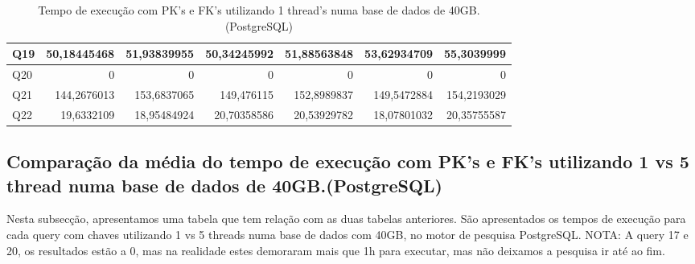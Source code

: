 \documentclass{article}
\begin{document}
\begin{table}[H]
{\begin{tabular}{|l|r|r|r|r|r|r|}
Q19&	50,18445468&	51,93839955	&50,34245992&	51,88563848	&53,62934709&	55,3039999\\ \hline
Q20&	0&	0	&0&	0	&0	&0\\ \hline
Q21&	144,2676013&	153,6837065&	149,476115	&152,8989837	&149,5472884&	154,2193029\\ \hline
Q22&	19,6332109&	18,95484924	&20,70358586	&20,53929782	&18,07801032&	20,35755587\\ \hline
    \end{tabular}}
    \caption{Tempo de execução com PK's e FK's utilizando 1 thread's numa base de dados de 40GB.(PostgreSQL)}
    \label{tab:BC_Table6}
  \end{table}


  \subsection{Comparação da média do tempo de execução com PK's e FK's utilizando 1 vs 5 thread numa base de dados de 40GB.(PostgreSQL)}
\quad Nesta subsecção, apresentamos uma tabela que tem relação com as duas tabelas anteriores. São apresentados os tempos de execução para cada query com chaves utilizando 1 vs 5 threads numa base de dados com 40GB, no motor de pesquisa PostgreSQL.
NOTA: A query 17 e 20, os resultados estão a 0, mas na realidade estes demoraram mais que 1h para executar, mas não deixamos a pesquisa ir até ao fim.
\end{document}
